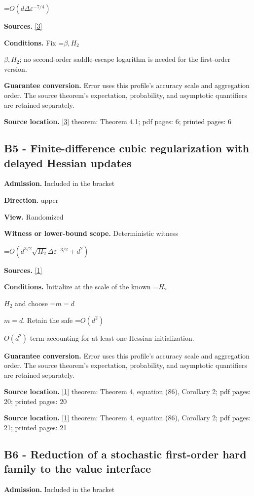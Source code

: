 \documentclass[10pt,a4paper]{article}
\newcommand{\AtlasMath}[1]{\par\begingroup\centering\setbox0=\hbox{$\displaystyle #1$}\ifdim\wd0>1.4\linewidth\typeout{ATLAS WIDE FORMULA: \the\wd0}\fi\ifdim\wd0>\linewidth\resizebox{\linewidth}{!}{\box0}\else\box0\fi\par\endgroup}
\newcommand{\AtlasInlineMath}[1]{\begingroup\setbox0=\hbox{$#1$}\ifdim\wd0>.4\linewidth\endgroup\AtlasMath{#1}\else\endgroup$#1$\fi}
\begin{document}
\AtlasMath{O(d\Delta\varepsilon^{-7/4})}
\textbf{Sources.} \href{https://proceedings.mlr.press/v235/he24h.html}{[3]}

\textbf{Conditions.} Fix \AtlasInlineMath{\beta,H_2}; no second-order saddle-escape logarithm is needed for the first-order version.

\textbf{Guarantee conversion.} Error uses this profile's accuracy scale and aggregation order. The source theorem's expectation, probability, and asymptotic quantifiers are retained separately.

\textbf{Source location.} \href{https://proceedings.mlr.press/v235/he24h.html}{[3]} theorem: Theorem 4.1; pdf pages: 6; printed pages: 6

\subsection{B5 - Finite-difference cubic regularization with delayed Hessian updates}
\textbf{Admission.} Included in the bracket

\textbf{Direction.} upper

\textbf{View.} Randomized

\textbf{Witness or lower-bound scope.} Deterministic witness

\AtlasMath{O(d^{3/2}\sqrt{H_2}\Delta\varepsilon^{-3/2}+d^2)}
\textbf{Sources.} \href{https://link.springer.com/article/10.1007/s10915-025-02842-z}{[1]}

\textbf{Conditions.} Initialize at the scale of the known \AtlasInlineMath{H_2} and choose \AtlasInlineMath{m=d}. Retain the safe \AtlasInlineMath{O(d^2)} term accounting for at least one Hessian initialization.

\textbf{Guarantee conversion.} Error uses this profile's accuracy scale and aggregation order. The source theorem's expectation, probability, and asymptotic quantifiers are retained separately.

\textbf{Source location.} \href{https://link.springer.com/article/10.1007/s10915-025-02842-z}{[1]} theorem: Theorem 4, equation (86), Corollary 2; pdf pages: 20; printed pages: 20

\textbf{Source location.} \href{https://link.springer.com/article/10.1007/s10915-025-02842-z}{[1]} theorem: Theorem 4, equation (86), Corollary 2; pdf pages: 21; printed pages: 21

\subsection{B6 - Reduction of a stochastic first-order hard family to the value interface}
\textbf{Admission.} Included in the bracket
\end{document}
